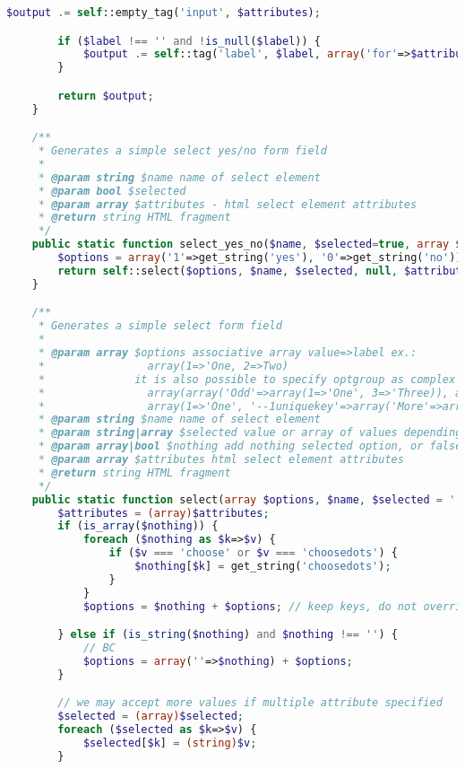 \begin{lstlisting}[language=PHP]
        $output .= self::empty_tag('input', $attributes);

        if ($label !== '' and !is_null($label)) {
            $output .= self::tag('label', $label, array('for'=>$attributes['id']));
        }

        return $output;
    }

    /**
     * Generates a simple select yes/no form field
     *
     * @param string $name name of select element
     * @param bool $selected
     * @param array $attributes - html select element attributes
     * @return string HTML fragment
     */
    public static function select_yes_no($name, $selected=true, array $attributes = null) {
        $options = array('1'=>get_string('yes'), '0'=>get_string('no'));
        return self::select($options, $name, $selected, null, $attributes);
    }

    /**
     * Generates a simple select form field
     *
     * @param array $options associative array value=>label ex.:
     *                array(1=>'One, 2=>Two)
     *              it is also possible to specify optgroup as complex label array ex.:
     *                array(array('Odd'=>array(1=>'One', 3=>'Three)), array('Even'=>array(2=>'Two')))
     *                array(1=>'One', '--1uniquekey'=>array('More'=>array(2=>'Two', 3=>'Three')))
     * @param string $name name of select element
     * @param string|array $selected value or array of values depending on multiple attribute
     * @param array|bool $nothing add nothing selected option, or false of not added
     * @param array $attributes html select element attributes
     * @return string HTML fragment
     */
    public static function select(array $options, $name, $selected = '', $nothing = array('' => 'choosedots'), array $attributes = null) {
        $attributes = (array)$attributes;
        if (is_array($nothing)) {
            foreach ($nothing as $k=>$v) {
                if ($v === 'choose' or $v === 'choosedots') {
                    $nothing[$k] = get_string('choosedots');
                }
            }
            $options = $nothing + $options; // keep keys, do not override

        } else if (is_string($nothing) and $nothing !== '') {
            // BC
            $options = array(''=>$nothing) + $options;
        }

        // we may accept more values if multiple attribute specified
        $selected = (array)$selected;
        foreach ($selected as $k=>$v) {
            $selected[$k] = (string)$v;
        }


\end{lstlisting}
